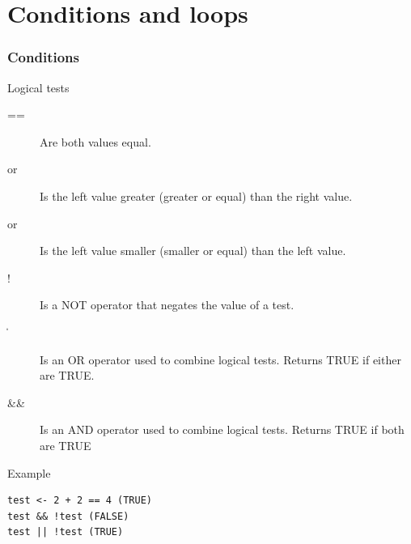 \documentclass[10pt]{beamer}
\newenvironment{xframe}[2][]
  {\begin{frame}[fragile,environment=xframe,#1]
  \frametitle{#2}}
  {\end{frame}}
\begin{document}


\section{Conditions and loops}
\begin{xframe}{Conditions}
  \begin{block}{Logical tests}
	
    \begin{description}
    \item[{\sf ==}] Are both values equal.
    \item[{\sf \succ or \geq}] Is the left value greater (greater or equal)
    than the right value.
	\item[{\sf \prec or \leq}] Is the left value smaller (smaller or equal) than
	the left value.
    \item[!] Is a NOT operator that negates the value of a test.
    \item[\|] Is an OR operator used to combine logical tests. Returns TRUE if
    either are TRUE.
    \item[\&\&] Is an AND operator used to combine logical tests. Returns TRUE
    if both are TRUE
    \end{description}
  \end{block}
  \begin{exampleblock}{Example}
\begin{verbatim}
test <- 2 + 2 == 4 (TRUE)
test && !test (FALSE)
test || !test (TRUE)
\end{verbatim}  
  \end{exampleblock}
\end{xframe}

\end{document}
